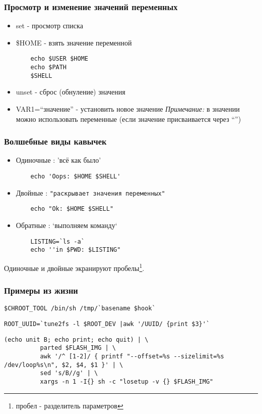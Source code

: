 \begin{frame}[fragile]
  \frametitle{Просмотр и изменение значений переменных}
  \normalsize{ }
  \begin{itemize}
    \item \alert{set} - просмотр списка \pause
    \item \alert{\$HOME} - взять значение переменной \pause
\begin{lstlisting}
	echo $USER $HOME
	echo $PATH 
	$SHELL
\end{lstlisting} \pause 
    \item \alert{unset} - сброс (обнуление) значения \pause
    \item \alert{VAR1=``значение''} - установить новое значение \newline 
      \emph{Примечание:} в значении можно использовать переменные (если значение присваивается через ``'')
  \end{itemize}

\end{frame}

\begin{frame}[fragile]
  \frametitle{Волшебные виды кавычек}

  \begin{itemize}
    \item \alert{Одиночные} : 'всё как было'
\begin{lstlisting}
	echo 'Oops: $HOME $SHELL'
\end{lstlisting} \pause
    \item \alert{Двойные} :  \verb+"раскрывает значения переменных"+
\begin{lstlisting}
	echo "Ok: $HOME $SHELL"
\end{lstlisting} \pause
    \item \alert{Обратные} : `выполняем команду`
\begin{lstlisting}
	LISTING=`ls -a`
	echo ''in $PWD: $LISTING"
\end{lstlisting}
  \end{itemize}
  Одиночные и двойные экранируют пробелы\footnote{пробел - разделитель параметров}.
\end{frame}

\begin{frame}[fragile]
  \frametitle{Примеры из жизни}
\begin{lstlisting}[basicstyle=\normalsize]
    $CHROOT_TOOL /bin/sh /tmp/`basename $hook`
\end{lstlisting} \pause

\begin{lstlisting}[basicstyle=\normalsize]
    ROOT_UUID=`tune2fs -l $ROOT_DEV |awk '/UUID/ {print $3}'`
\end{lstlisting} \pause
  
\begin{lstlisting}[basicstyle=\small]
    (echo unit B; echo print; echo quit) | \
          parted $FLASH_IMG | \
          awk '/^ [1-2]/ { printf "--offset=%s --sizelimit=%s /dev/loop%s\n", $2, $4, $1 }' | \
          sed 's/B//g' | \
          xargs -n 1 -I{} sh -c "losetup -v {} $FLASH_IMG"
\end{lstlisting}
\end{frame}

